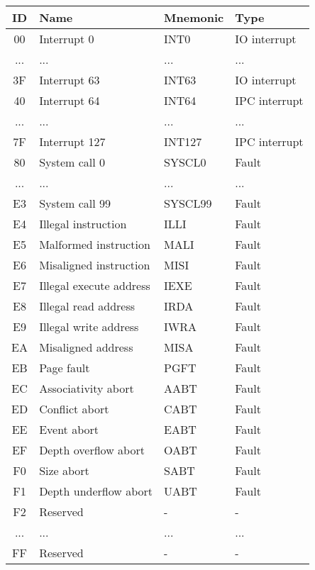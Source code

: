 \begin{table}[hbt!] %

    \begin{center}

    \begin{tabular}{|c|l|l|l|}

        \hline
        ID & Name & Mnemonic & Type \\
        \hline
        00 & Interrupt 0 & INT0 & IO interrupt \\
        \hline
        ... & ... & ... & ... \\
        \hline
        3F & Interrupt 63 & INT63 & IO interrupt \\
        \hline
        40 & Interrupt 64 & INT64 & IPC interrupt \\
        \hline
        ... & ... & ... & ... \\
        \hline
        7F & Interrupt 127 & INT127 & IPC interrupt \\
        \hline
        80 & System call 0 & SYSCL0 & Fault \\
        \hline
        ... & ... & ... & ... \\
        \hline
        E3 & System call 99 & SYSCL99 & Fault \\
        \hline
        E4 & Illegal instruction & ILLI & Fault \\
        \hline
        E5 & Malformed instruction & MALI & Fault \\
        \hline
        E6 & Misaligned instruction & MISI & Fault \\
        \hline
        E7 & Illegal execute address & IEXE & Fault \\
        \hline
        E8 & Illegal read address & IRDA & Fault \\
        \hline
        E9 & Illegal write address & IWRA & Fault \\
        \hline
        EA & Misaligned address & MISA & Fault \\
        \hline
        EB & Page fault & PGFT & Fault \\
        \hline
        EC & Associativity abort & AABT & Fault \\
        \hline
        ED & Conflict abort & CABT & Fault \\
        \hline
        EE & Event abort & EABT & Fault \\
        \hline
        EF & Depth overflow abort & OABT & Fault \\
        \hline
        F0 & Size abort & SABT & Fault \\
        \hline
        F1 & Depth underflow abort & UABT & Fault \\
        \hline
        F2 & Reserved & - & - \\
        \hline
        ... & ... & ... & ... \\
        \hline
        FF & Reserved & - & - \\
        \hline


\end{tabular}
\end{center}
\end{table}
